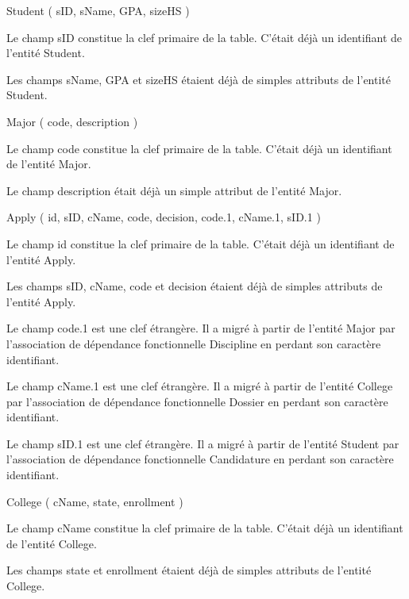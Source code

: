 \documentclass[11pt]{article}
\begin{document}
{Student} ( {sID}, {sName}, {GPA}, {sizeHS} )

Le champ sID constitue la clef primaire de la table. C'était déjà un
identifiant de l'entité Student.

Les champs sName, GPA et sizeHS étaient déjà de simples attributs de
l'entité Student.

{Major} ( {code}, {description} )

Le champ code constitue la clef primaire de la table. C'était déjà un
identifiant de l'entité Major.

Le champ description était déjà un simple attribut de l'entité Major.

{Apply} ( {id}, {sID}, {cName}, {code}, {decision}, {code.1}, {cName.1},
{sID.1} )

Le champ id constitue la clef primaire de la table. C'était déjà un
identifiant de l'entité Apply.

Les champs sID, cName, code et decision étaient déjà de simples
attributs de l'entité Apply.

Le champ code.1 est une clef étrangère. Il a migré à partir de l'entité
Major par l'association de dépendance fonctionnelle Discipline en
perdant son caractère identifiant.

Le champ cName.1 est une clef étrangère. Il a migré à partir de l'entité
College par l'association de dépendance fonctionnelle Dossier en perdant
son caractère identifiant.

Le champ sID.1 est une clef étrangère. Il a migré à partir de l'entité
Student par l'association de dépendance fonctionnelle Candidature en
perdant son caractère identifiant.

{College} ( {cName}, {state}, {enrollment} )

Le champ cName constitue la clef primaire de la table. C'était déjà un
identifiant de l'entité College.

Les champs state et enrollment étaient déjà de simples attributs de
l'entité College.


    
    
    
    
\end{document}
